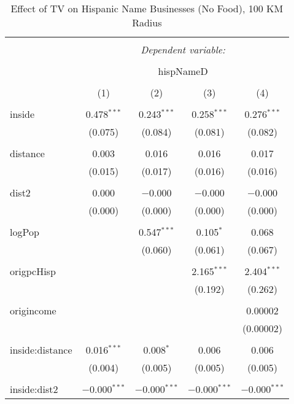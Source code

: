 
\begin{table}[!htbp] \centering 
  \caption{Effect of TV on Hispanic Name Businesses (No Food), 100 KM Radius} 
  \label{} 
\begin{tabular}{@{\extracolsep{-5pt}}lcccc} 
\\[-1.8ex]\hline 
\hline \\[-1.8ex] 
 & \multicolumn{4}{c}{\textit{Dependent variable:}} \\ 
\cline{2-5} 
\\[-1.8ex] & \multicolumn{4}{c}{hispNameD} \\ 
\\[-1.8ex] & (1) & (2) & (3) & (4)\\ 
\hline \\[-1.8ex] 
 inside & 0.478$^{***}$ & 0.243$^{***}$ & 0.258$^{***}$ & 0.276$^{***}$ \\ 
  & (0.075) & (0.084) & (0.081) & (0.082) \\ 
  & & & & \\ 
 distance & 0.003 & 0.016 & 0.016 & 0.017 \\ 
  & (0.015) & (0.017) & (0.016) & (0.016) \\ 
  & & & & \\ 
 dist2 & 0.000 & $-$0.000 & $-$0.000 & $-$0.000 \\ 
  & (0.000) & (0.000) & (0.000) & (0.000) \\ 
  & & & & \\ 
 logPop &  & 0.547$^{***}$ & 0.105$^{*}$ & 0.068 \\ 
  &  & (0.060) & (0.061) & (0.067) \\ 
  & & & & \\ 
 origpcHisp &  &  & 2.165$^{***}$ & 2.404$^{***}$ \\ 
  &  &  & (0.192) & (0.262) \\ 
  & & & & \\ 
 origincome &  &  &  & 0.00002 \\ 
  &  &  &  & (0.00002) \\ 
  & & & & \\ 
 inside:distance & 0.016$^{***}$ & 0.008$^{*}$ & 0.006 & 0.006 \\ 
  & (0.004) & (0.005) & (0.005) & (0.005) \\ 
  & & & & \\ 
 inside:dist2 & $-$0.000$^{***}$ & $-$0.000$^{***}$ & $-$0.000$^{***}$ & $-$0.000$^{***}$ \\ 

\end{tabular}
\end{table}
